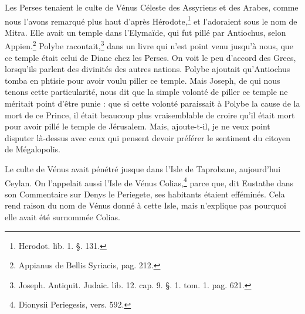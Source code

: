 \documentclass[a4paper, 11pt, oneside, polutonikogreek, french]{article}
\begin{document}
Les Perses tenaient le culte de Vénus Céleste des Assyriens et des Arabes, comme nous l'avons remarqué plus haut d'après Hérodote,\footnote{Herodot. lib. 1. §. 131.} et l'adoraient sous le nom de Mitra. Elle avait un temple dans l'Elymaïde, qui fut pillé par Antiochus, selon Appien.\footnote{Appianus de Bellis Syriacis, pag. 212.} Polybe racontait,\footnote{Joseph. Antiquit. Judaic. lib. 12. cap. 9. §. 1. tom. 1. pag. 621.} dans un livre qui n'est point venu jusqu'à nous, que ce temple était celui de Diane chez les Perses. On voit le peu d'accord des Grecs, lorsqu'ils parlent des divinités des autres nations. Polybe ajoutait qu'Antiochus tomba en phtisie pour avoir voulu piller ce temple. Mais Joseph, de qui nous tenons cette particularité, nous dit que la simple volonté de piller ce temple ne méritait point d'être punie : que si cette volonté paraissait à Polybe la cause de la mort de ce Prince, il était beaucoup plus vraisemblable de croire qu'il était mort pour avoir pillé le temple de Jérusalem. Mais, ajoute-t-il, je ne veux point disputer là-dessus avec ceux qui pensent devoir préférer le sentiment du citoyen de Mégalopolis.

Le culte de Vénus avait pénétré jusque dans l'Isle de Taprobane, aujourd'hui Ceylan. On l'appelait aussi l'Isle de Vénus Colias,\footnote{Dionysii Periegesis, vers. 592.} parce que, dit Eustathe dans son Commentaire sur Denys le Periegete, ses habitants étaient efféminés. Cela rend raison du nom de Vénus donné à cette Isle, mais n'explique pas pourquoi elle avait été surnommée Colias.
\end{document}
